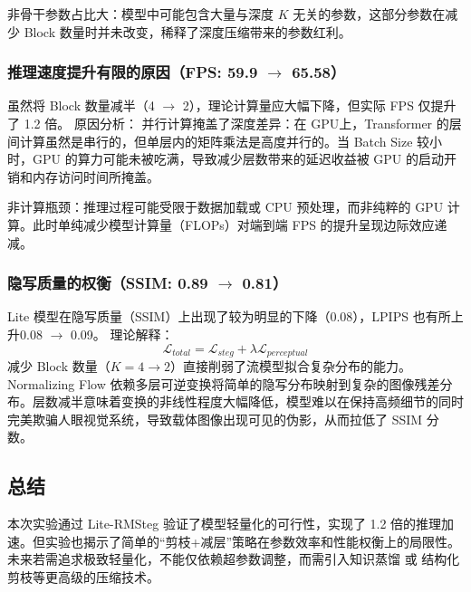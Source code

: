 \documentclass[12pt]{ctexart}
\begin{document}
非骨干参数占比大：模型中可能包含大量与深度 $K$ 无关的参数，这部分参数在减少 Block 数量时并未改变，稀释了深度压缩带来的参数红利。

\subsubsection{推理速度提升有限的原因（FPS: 59.9 \texorpdfstring{$\to$}{->} 65.58）}
虽然将 Block 数量减半（4 \texorpdfstring{$\to$}{->} 2），理论计算量应大幅下降，但实际 FPS 仅提升了 1.2 倍。
原因分析：
并行计算掩盖了深度差异：在 GPU上，Transformer 的层间计算虽然是串行的，但单层内的矩阵乘法是高度并行的。当 Batch Size 较小时，GPU 的算力可能未被吃满，导致减少层数带来的延迟收益被 GPU 的启动开销和内存访问时间所掩盖。

非计算瓶颈：推理过程可能受限于数据加载或 CPU 预处理，而非纯粹的 GPU 计算。此时单纯减少模型计算量（FLOPs）对端到端 FPS 的提升呈现边际效应递减。

\subsubsection{隐写质量的权衡（SSIM: 0.89 \texorpdfstring{$\to$}{->} 0.81）}
Lite 模型在隐写质量（SSIM）上出现了较为明显的下降（0.08），LPIPS 也有所上升0.08 \texorpdfstring{$\to$}{->} 0.09。
理论解释：
\begin{equation}
    \mathcal{L}_{total} = \mathcal{L}_{steg} + \lambda \mathcal{L}_{perceptual}
\end{equation}
\indent 减少 Block 数量（$K=4 \to 2$）直接削弱了流模型拟合复杂分布的能力。Normalizing Flow 依赖多层可逆变换将简单的隐写分布映射到复杂的图像残差分布。层数减半意味着变换的非线性程度大幅降低，模型难以在保持高频细节的同时完美欺骗人眼视觉系统，导致载体图像出现可见的伪影，从而拉低了 SSIM 分数。

\subsection{总结}
本次实验通过 Lite-RMSteg 验证了模型轻量化的可行性，实现了 1.2 倍的推理加速。但实验也揭示了简单的“剪枝+减层”策略在参数效率和性能权衡上的局限性。未来若需追求极致轻量化，不能仅依赖超参数调整，而需引入知识蒸馏 或 结构化剪枝等更高级的压缩技术。
\end{document}
